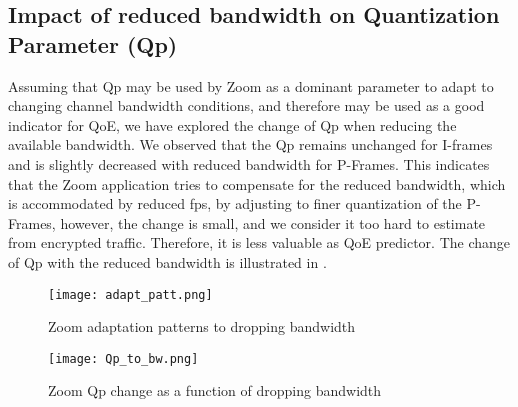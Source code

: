 \subsection{Impact of reduced bandwidth on Quantization Parameter (Qp)}
Assuming that Qp may be used by Zoom as a dominant parameter to adapt to changing channel bandwidth conditions, and therefore may be used as a good indicator for QoE, we have explored the change of Qp when reducing the available bandwidth. We observed that the Qp remains unchanged for I-frames and is slightly decreased with reduced bandwidth for P-Frames. This indicates that the Zoom application tries to compensate for the reduced bandwidth, which is accommodated by reduced fps, by adjusting to finer quantization of the P-Frames, however, the change is small, and we consider it too hard to estimate from encrypted traffic. Therefore, it is less valuable as QoE predictor. The change of Qp with the reduced bandwidth is illustrated in .

\begin{figure}
    \centering
    \texttt{[image: adapt\_patt.png]}
    \caption{Zoom adaptation patterns to dropping bandwidth}
    \label{fig:adapt-patt}
\end{figure}

\begin{figure}
    \centering
    \texttt{[image: Qp\_to\_bw.png]}
    \caption{Zoom Qp change as a function of dropping bandwidth}
    \label{fig:qp-change}
\end{figure}

